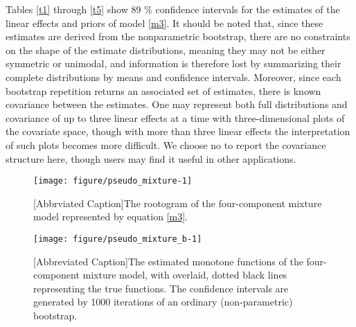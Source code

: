 \documentclass[10pt]{olplainarticle}\usepackage[]{graphicx}\usepackage[]{color}
\makeatletter
\def\maxwidth{ %
  \ifdim\Gin@nat@width>\linewidth
    \linewidth
  \else
    \Gin@nat@width
  \fi
}
\newenvironment{knitrout}{}{} %
\makeatother
\begin{document}
Tables \ref{t1} through \ref{t5} show 89 \% confidence intervals for the estimates of the linear effects and priors of model \ref{m3}. It should be noted that, since these estimates are derived from the nonparametric bootstrap, there are no constraints on the shape of the estimate distributions, meaning they may not be either symmetric or unimodal, and information is therefore lost by summarizing their complete distributions by means and confidence intervals. Moreover, since each bootstrap repetition returns an associated set of estimates, there is known covariance between the estimates. One may represent both full distributions and covariance of up to three linear effects at a time with three-dimensional plots of the covariate space, though with more than three linear effects the interpretation of such plots becomes more difficult. We choose no to report the covariance structure here, though users may find it useful in other applications.


\begin{figure}[H]
\begin{knitrout}
\color{fgcolor}

{\centering \texttt{[image: figure/pseudo\_mixture-1]} 

}



\end{knitrout}
[Abbrviated Caption]{The rootogram of the four-component mixture model represented by equation \ref{m3}.}
\end{figure}

\begin{figure}[H]
\begin{knitrout}
\color{fgcolor}

{\centering \texttt{[image: figure/pseudo\_mixture\_b-1]} 

}



\end{knitrout}
[Abbreviated Caption]{The estimated monotone functions of the four-component mixture model, with overlaid, dotted black lines representing the true functions. The confidence intervals are generated by 1000 iterations of an ordinary (non-parametric) bootstrap.}
\end{figure}
\end{document}
